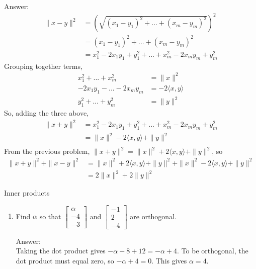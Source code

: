 \documentclass[11pt]{amsart}
\begin{document}
{\begin{enumerate}
{\begin{enumerate}
Answer: 
\begin{align} \nonumber
\|x-y\|^2 &= (\sqrt{(x_1 - y_1)^2 + ... + (x_m - y_m)^2})^2 \\ \nonumber
              &= (x_1 - y_1)^2 + ... + (x_m - y_m)^2 \\ \nonumber
		     &= x_1^2 - 2x_1y_1 + y_1^2 + ... + x_m^2 - 2x_my_m + y_m^2 
\end{align}
Grouping together terms,
\begin{align} \nonumber
x_1^2 + ... + x_m^2 &= \|x\|^2 \\ \nonumber
-2x_1y_1 - ... - 2x_my_m &= -2\langle x, y \rangle \\ \nonumber
y_1^2 + ... + y_m^2 &= \|y\|^2 
\end{align} 
So, adding the three above, 
\begin{align} \nonumber
\|x+y\|^2 &= x_1^2 - 2x_1y_1 + y_1^2 + ... + x_m^2 - 2x_my_m + y_m^2 \\ \nonumber
              &= \|x\|^2 - 2\langle x, y \rangle + \|y\|^2 \\ \nonumber
\end{align}
From the previous problem, $\|x+y\|^2 = \|x\|^2 + 2\langle x, y \rangle + \|y\|^2$, so 
\begin{align} \nonumber
\|x+y\|^2 + \|x-y\|^2 &= \|x\|^2 + 2\langle x, y \rangle + \|y\|^2 + \|x\|^2 - 2\langle x, y \rangle + \|y\|^2 \\ \nonumber
                               &= 2\|x\|^2 + 2\|y\|^2
\end{align}
\end{enumerate}

\bigskip

\item[Problem 9:] Inner products

\begin{enumerate}
\item Find $\alpha$ so that $\begin{bmatrix} \alpha \\ -4\\ -3\end{bmatrix}$ and $\begin{bmatrix} -1 \\ 2\\ -4\end{bmatrix}$
are orthogonal. 

Answer: \\
Taking the dot product gives $-\alpha - 8 + 12 = -\alpha + 4$. To be orthogonal, the dot product must equal zero, so 
$-\alpha + 4 = 0$. This gives $\alpha = 4$. 


\end{enumerate}}
\end{enumerate}}
\end{document}
